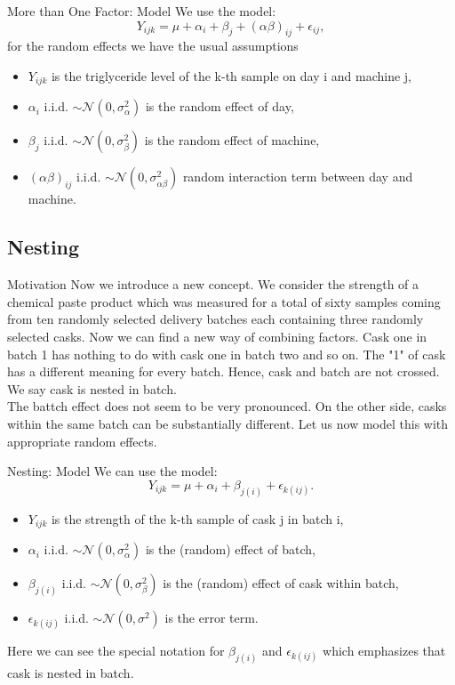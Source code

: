 \documentclass[unknownkeysallowed]{beamer}
\begin{document}
\begin{frame}{More than One Factor: Model}
	 We use the model:
	\begin{equation*}
		Y_{ijk} = \mu + \alpha_i + \beta_j + (\alpha \beta)_{ij} + \epsilon_{ij},
	\end{equation*}
	for the random effects we have the usual assumptions
	\begin{itemize}
		\item $Y_{ijk}$ is the triglyceride level of the k-th sample on day i and machine j,
		\item $\alpha_i$ i.i.d.  
		$\sim \mathcal{N}(0,\sigma^2_{\alpha})$ is the random effect of day,
		\item $\beta_j$ i.i.d.  
		$\sim \mathcal{N}(0,\sigma^2_{\beta})$ is the random effect of machine,
		\item $(\alpha \beta)_{ij}$ i.i.d.  
		$\sim \mathcal{N}(0,\sigma^2_{\alpha \beta})$ random interaction term between day and machine.
	\end{itemize}
\end{frame}

\subsection{Nesting}
\begin{frame}{Motivation}
	Now we introduce a new concept. We consider the strength of a chemical paste product which was measured for a total of sixty samples coming from ten randomly selected delivery batches each containing three randomly selected casks. Now we can find a new way of combining factors. Cask one in batch 1 has nothing to do with cask one in batch two and so on. The "1" of cask has a different meaning for every batch. Hence, cask and batch are not crossed. We say cask is nested in batch.\\
	The battch effect does not seem to be very pronounced. On the other side, casks within the same batch can be substantially different. Let us now model this with appropriate random effects.
\end{frame}


\begin{frame}{Nesting: Model}
	We can use the model:
	\begin{equation*}
		Y_{ijk} = \mu + \alpha_i + \beta_{j(i)} + \epsilon_{k(ij)}.
	\end{equation*}
	\begin{itemize}
		\item $Y_{ijk}$ is the strength of the k-th sample of cask j in batch i,
		\item $\alpha_i$ i.i.d.  
		$\sim \mathcal{N}(0,\sigma^2_{\alpha})$ is the (random) effect of batch,
		\item $\beta_{j(i)}$ i.i.d.  
		$\sim \mathcal{N}(0,\sigma^2_{\beta})$ is the (random) effect of cask within batch,
		\item $\epsilon_{k(ij)}$ i.i.d.  
		$\sim \mathcal{N}(0,\sigma^2)$ is the error term.
	\end{itemize}
	Here we can see the special notation for $\beta_{j(i)}$ and $\epsilon_{k(ij)}$ which emphasizes that cask is nested in batch.
\end{frame}
\end{document}
